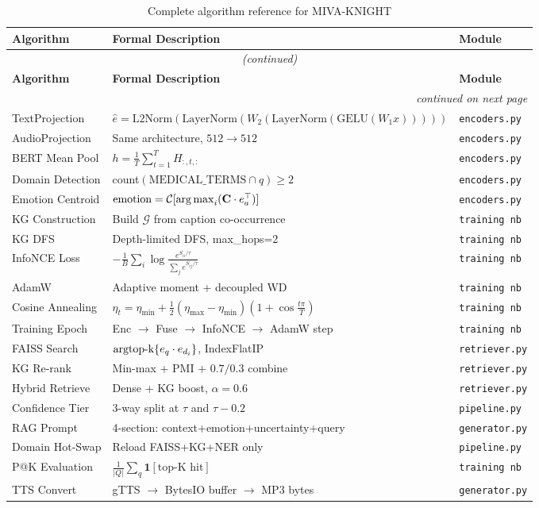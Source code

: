 \documentclass[12pt,a4paper]{article}
\theoremstyle{definition}
\theoremstyle{plain}
\theoremstyle{remark}
\newcommand{\KG}{\mathcal{G}}
\newcommand{\LN}{\mathrm{LayerNorm}}
\newcommand{\GELU}{\mathrm{GELU}}
\newcommand{\argmax}{\operatornamewithlimits{arg\,max}}
\newcommand{\argtopk}{\operatornamewithlimits{argtop\text{-}k}}
\begin{document}
\begin{longtable}{p{3.5cm} p{6.5cm} p{4cm}}
\caption{Complete algorithm reference for MIVA-KNIGHT}\\
\toprule
\textbf{Algorithm} & \textbf{Formal Description} & \textbf{Module} \\
\midrule
\endfirsthead
\multicolumn{3}{c}{\textit{(continued)}}\\
\toprule
\textbf{Algorithm} & \textbf{Formal Description} & \textbf{Module} \\
\midrule
\endhead
\midrule
\multicolumn{3}{r}{\textit{continued on next page}}\\
\endfoot
\bottomrule
\endlastfoot

TextProjection & $\hat{e} = \text{L2Norm}(\LN(W_2(\LN(\GELU(W_1 x)))))$ & \texttt{encoders.py} \\[3pt]
AudioProjection & Same architecture, $512\to512$ & \texttt{encoders.py} \\[3pt]
BERT Mean Pool & $h = \frac{1}{T}\sum_{t=1}^T H_{:,t,:}$ & \texttt{encoders.py} \\[3pt]
Domain Detection & count$(\text{MEDICAL\_TERMS} \cap q) \ge 2$ & \texttt{encoders.py} \\[3pt]
Emotion Centroid & $\text{emotion}= \mathcal{C}[\argmax_i(\mathbf{C}\cdot e_a^\top)]$ & \texttt{encoders.py} \\[3pt]
KG Construction & Build $\KG$ from caption co-occurrence & \texttt{training nb} \\[3pt]
KG DFS & Depth-limited DFS, max\_hops=2 & \texttt{training nb} \\[3pt]
InfoNCE Loss & $-\frac{1}{B}\sum_i \log\frac{e^{S_{ii}/\tau}}{\sum_j e^{S_{ij}/\tau}}$ & \texttt{training nb} \\[3pt]
AdamW & Adaptive moment + decoupled WD & \texttt{training nb} \\[3pt]
Cosine Annealing & $\eta_t = \eta_{\min}+\frac{1}{2}(\eta_{\max}-\eta_{\min})(1+\cos\frac{t\pi}{T})$ & \texttt{training nb} \\[3pt]
Training Epoch & Enc $\to$ Fuse $\to$ InfoNCE $\to$ AdamW step & \texttt{training nb} \\[3pt]
FAISS Search & $\argtopk\{e_q \cdot e_{d_i}\}$, IndexFlatIP & \texttt{retriever.py} \\[3pt]
KG Re-rank & Min-max + PMI + $0.7/0.3$ combine & \texttt{retriever.py} \\[3pt]
Hybrid Retrieve & Dense + KG boost, $\alpha=0.6$ & \texttt{retriever.py} \\[3pt]
Confidence Tier & 3-way split at $\tau$ and $\tau{-}0.2$ & \texttt{pipeline.py} \\[3pt]
RAG Prompt & 4-section: context+emotion+uncertainty+query & \texttt{generator.py} \\[3pt]
Domain Hot-Swap & Reload FAISS+KG+NER only & \texttt{pipeline.py} \\[3pt]
P@K Evaluation & $\frac{1}{|Q|}\sum_q \mathbf{1}[\text{top-K hit}]$ & \texttt{training nb} \\[3pt]
TTS Convert & gTTS $\to$ BytesIO buffer $\to$ MP3 bytes & \texttt{generator.py} \\
\end{longtable}
\end{document}
